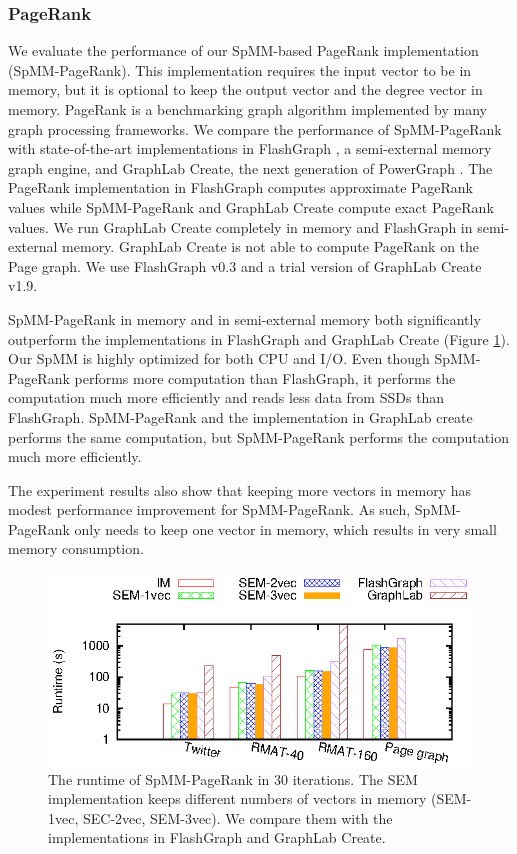 \subsubsection{PageRank}
We evaluate the performance of our SpMM-based PageRank implementation
(SpMM-PageRank). This implementation requires the input vector to be in memory,
but it is optional to keep the output vector and the degree vector in memory.
PageRank is a benchmarking graph algorithm implemented by many graph processing
frameworks. We compare the performance of SpMM-PageRank with state-of-the-art
implementations in FlashGraph \cite{FlashGraph}, a semi-external memory graph
engine, and GraphLab Create, the next generation of PowerGraph \cite{powergraph}.
The PageRank implementation in FlashGraph computes
approximate PageRank values while SpMM-PageRank and GraphLab Create compute
exact PageRank values. We run GraphLab Create completely in memory and
FlashGraph in semi-external memory. GraphLab Create is not able to compute
PageRank on the Page graph. We use FlashGraph v0.3 and a trial version of
GraphLab Create v1.9.

SpMM-PageRank in memory and in semi-external memory both significantly outperform
the implementations in FlashGraph and GraphLab Create (Figure \ref{perf:pagerank}).
Our SpMM is highly optimized for both CPU
and I/O. Even though SpMM-PageRank performs more computation than FlashGraph,
it performs the computation much more efficiently and
reads less data from SSDs than FlashGraph. SpMM-PageRank and the implementation
in GraphLab create performs the same computation, but SpMM-PageRank
performs the computation much more efficiently.

The experiment results also show that keeping more vectors in memory has modest
performance improvement for SpMM-PageRank. As such, SpMM-PageRank only needs
to keep one vector in memory, which results in very small memory consumption.

\begin{figure}
	\begin{center}
		\footnotesize
		\includegraphics[scale=1]{SpMM_figs/pagerank.eps}
		\caption{The runtime of SpMM-PageRank in 30 iterations. The SEM
			implementation keeps different numbers of vectors in memory
			(SEM-1vec, SEC-2vec, SEM-3vec). We compare them with
		the implementations in FlashGraph and GraphLab Create.}
		\label{perf:pagerank}
	\end{center}
\end{figure}

